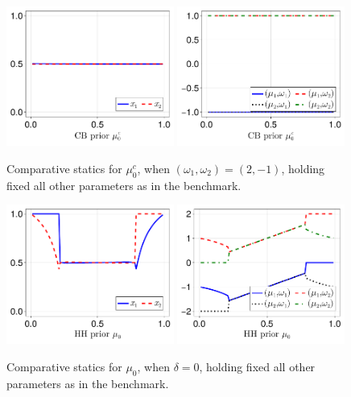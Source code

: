 \documentclass[12pt,a4paper]{article}
\begin{document}
\begin{figure}[H]
\centering
\includegraphics[width=0.49\textwidth]{figures/V8/γ_1/fig_optimal_π_across_μ_0_c_ω_1_2_ω_2_-1_δ_0.5_.pdf}
\includegraphics[width=0.49\textwidth]{figures/V8/γ_1/fig_posterior_across_μ_0_c_ω_1_2_ω_2_-1_δ_0.5_.pdf}
\caption{Comparative statics for $\mu_0^c$, when $(\omega_1,\omega_2)=(2,-1)$, holding fixed all other parameters as in the benchmark.}
\label{FigureA20}
\end{figure}

\begin{figure}[H]
\centering
\includegraphics[width=0.49\textwidth]{figures/V8/γ_1/fig_optimal_π_across_μ_0_ω_1_1_ω_2_-1_δ_0.0_.pdf}
\includegraphics[width=0.49\textwidth]{figures/V8/γ_1/fig_posterior_across_μ_0_ω_1_1_ω_2_-1_δ_0.0_.pdf}
\caption{Comparative statics for $\mu_0$, when $\delta=0$, holding fixed all other parameters as in the benchmark.}
\label{FigureA21}
\end{figure}
\end{document}
